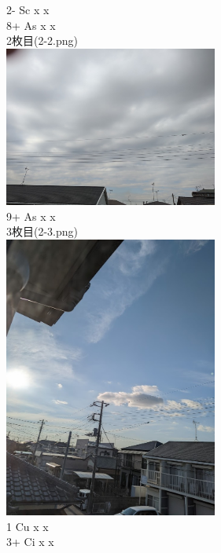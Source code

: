 \documentclass{jsarticle}
\newenvironment{problems}
{
  \renewcommand\labelenumi{\doublebox{\arabic{enumi}}}
  \begin{enumerate}
}{
  \end{enumerate}
  \renewcommand\labelenumi{\arabic{enumi}.}
}
\begin{document}
\begin{problems}
2- Sc x x\\
8+ As x x\\
2枚目(2-2.png)\\
\includegraphics[width=7cm]{2-2.png}\\
9+ As x x\\


3枚目(2-3.png)\\
\includegraphics[width=7cm]{2-3.png}\\
1 Cu x x\\
3+ Ci x x\\


\end{problems}
\end{document}
